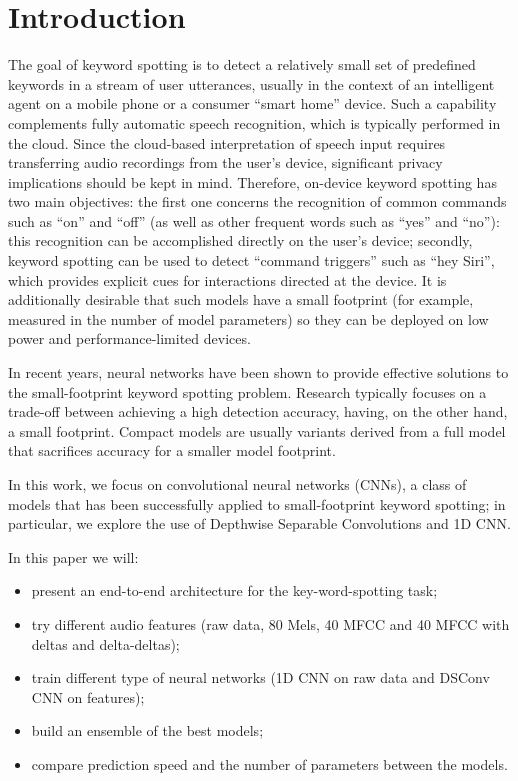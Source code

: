 \documentclass[conference]{IEEEtran}
\begin{document}
\section{Introduction}
The goal of keyword spotting is to detect a relatively small set of predefined keywords in a stream of user utterances, usually in the context of an intelligent agent on a mobile phone or a consumer “smart home” device. Such a capability complements fully automatic speech recognition, which is typically performed in the cloud. Since the cloud-based interpretation of speech input requires transferring audio recordings from the user’s device, significant privacy implications should be kept in mind. Therefore, on-device keyword spotting has two main objectives: the first one concerns the recognition of common commands such as “on” and “off” (as well as other frequent words such as “yes” and “no”): this recognition can be accomplished directly on the user’s device; secondly, keyword spotting can be used to detect “command triggers” such as “hey Siri”, which provides explicit cues for interactions directed at the device. It is additionally desirable that such models have a small footprint (for example, measured in the number of model parameters) so they can be deployed on low power and performance-limited devices.

In recent years, neural networks have been shown to provide effective solutions to the small-footprint keyword spotting problem. Research typically focuses on a trade-off between achieving a high detection accuracy, having, on the other hand, a small footprint. Compact models are usually variants derived from a full model that sacrifices accuracy for a smaller model footprint.

In this work, we focus on convolutional neural networks (CNNs), a class of models that has been successfully applied to small-footprint keyword spotting; in particular, we explore the use of Depthwise Separable Convolutions and 1D CNN.

In this paper we will: 
\begin{itemize}
\setlength{\itemsep}{0pt}
  \setlength{\parskip}{0pt}
  \setlength{\parsep}{0pt}
\item present an end-to-end architecture for the key-word-spotting task;
\item try different audio features (raw data, 80 Mels, 40 MFCC and 40 MFCC with deltas and delta-deltas);
\item train different type of neural networks (1D CNN on raw data and DSConv CNN on features);
\item build an ensemble of the best models;
\item compare prediction speed and the number of parameters between the models.
\end{itemize}
\end{document}
